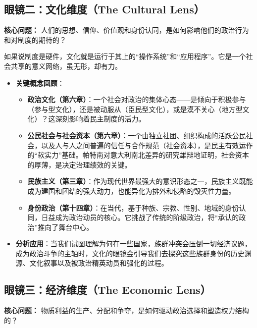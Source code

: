 \subsection{眼镜二：文化维度（The Cultural Lens）}
\textbf{核心问题：} 人们的思想、信仰、价值观和身份认同，是如何影响他们的政治行为和对制度的期待的？

如果说制度是硬件，文化就是运行于其上的“操作系统”和“应用程序”。它是一个社会共享的意义网络，虽无形，却有力。
\begin{itemize}
    \item \textbf{关键概念回顾}：
    \begin{itemize}
        \item \textbf{政治文化（第六章）}：一个社会对政治的集体心态——是倾向于积极参与（参与型文化），还是被动服从（臣民型文化），或是漠不关心（地方型文化）？这深刻影响着民主制度的活力。
        \item \textbf{公民社会与社会资本（第六章）}：一个由独立社团、组织构成的活跃公民社会，以及人与人之间普遍的信任与合作规范（社会资本），是民主有效运作的“软实力”基础。帕特南对意大利南北差异的研究雄辩地证明，社会资本的厚薄，是决定治理绩效的关键。
        \item \textbf{民族主义（第三章）}：作为现代世界最强大的意识形态之一，民族主义既能成为建国和团结的强大动力，也能异化为排外和侵略的毁灭性力量。
        \item \textbf{身份政治（第十四章）}：在当代，基于种族、宗教、性别、地域的身份认同，日益成为政治动员的核心。它挑战了传统的阶级政治，将“承认的政治”推向了舞台中心。
    \end{itemize}
    \item \textbf{分析应用}：当我们试图理解为何在一些国家，族群冲突会压倒一切经济议题，成为政治斗争的主轴时，文化的眼镜会引导我们去探究这些族群身份的历史渊源、文化叙事以及被政治精英动员和强化的过程。
\end{itemize}

\subsection{眼镜三：经济维度（The Economic Lens）}
\textbf{核心问题：} 物质利益的生产、分配和争夺，是如何驱动政治选择和塑造权力结构的？

